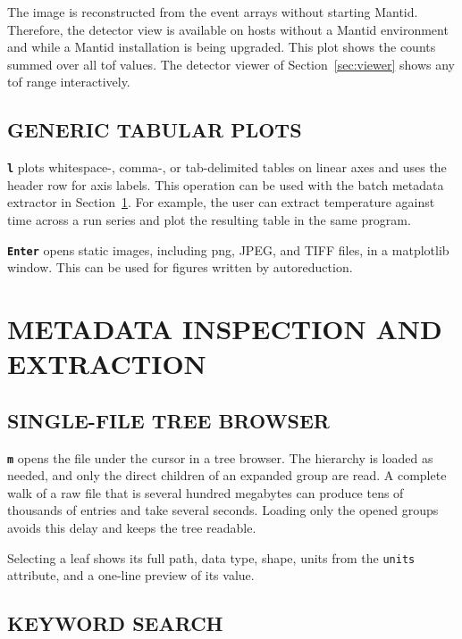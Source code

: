 \documentclass[tm]{ornltm}
\newcommand{\key}[1]{\textbf{\texttt{#1}}}
\begin{document}
The image is reconstructed from the event arrays without starting Mantid.
Therefore, the detector view is available on hosts without a Mantid environment
and while a Mantid installation is being upgraded. This plot shows the counts
summed over all \ac{tof} values. The detector viewer of
Section~\ref{sec:viewer} shows any \ac{tof} range interactively.

\subsection{GENERIC TABULAR PLOTS}

\key{l} plots whitespace-, comma-, or tab-delimited tables on linear axes and
uses the header row for axis labels. This operation can be used with the batch
metadata extractor in Section~\ref{sec:meta}. For example, the user can extract
temperature against time across a run series and plot the resulting table in the
same program.

\key{Enter} opens static images, including \ac{png}, JPEG, and TIFF files, in a
matplotlib window. This can be used for figures written by autoreduction.

\section{METADATA INSPECTION AND EXTRACTION}
\label{sec:meta}

\subsection{SINGLE-FILE TREE BROWSER}

\key{m} opens the file under the cursor in a tree browser. The hierarchy is
loaded as needed, and only the direct children of an expanded group are read.
A complete walk of a raw file that is several hundred megabytes can produce tens
of thousands of entries and take several seconds. Loading only the opened groups
avoids this delay and keeps the tree readable.

Selecting a leaf shows its full path, data type, shape, units from the
\texttt{units} attribute, and a one-line preview of its value.

\subsection{KEYWORD SEARCH}
\label{sec:hdfsearch}
\end{document}
